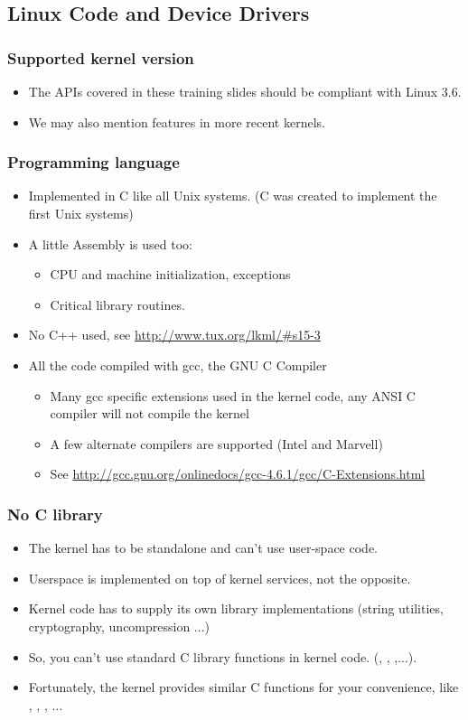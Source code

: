 \subsection{Linux Code and Device Drivers}

\begin{frame}
  \frametitle{Supported kernel version}
  \begin{itemize}
  \item The APIs covered in these training slides should be compliant
    with Linux 3.6.
  \item We may also mention features in more recent kernels.
  \end{itemize}
\end{frame}


\begin{frame}
  \frametitle{Programming language}
  \begin{itemize}
  \item Implemented in C like all Unix systems. (C was created to
    implement the first Unix systems)
  \item A little Assembly is used too:
    \begin{itemize}
    \item CPU and machine initialization, exceptions
    \item Critical library routines.
    \end{itemize}
  \item No C++ used, see \url{http://www.tux.org/lkml/\#s15-3}
  \item All the code compiled with gcc, the GNU C Compiler
    \begin{itemize}
    \item Many gcc specific extensions used in the kernel code, any
      ANSI C compiler will not compile the kernel
    \item A few alternate compilers are supported (Intel and Marvell)
    \item See
      \url{http://gcc.gnu.org/onlinedocs/gcc-4.6.1/gcc/C-Extensions.html}
    \end{itemize}
  \end{itemize}
\end{frame}

\begin{frame}
  \frametitle{No C library}
  \begin{itemize}
  \item The kernel has to be standalone and can't use user-space code.
  \item Userspace is implemented on top of kernel services, not the
    opposite.
  \item Kernel code has to supply its own library implementations
    (string utilities, cryptography, uncompression ...)
  \item So, you can't use standard C library functions in kernel code.
    (, , ,...).
  \item Fortunately, the kernel provides similar C functions for your
    convenience, like , ,
    , ...
  \end{itemize}
\end{frame}

